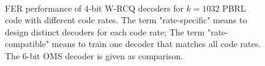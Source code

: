 \documentclass [PhD] {uclathes}
\begin{document}
\begin{figure}[hp] 
    \centering
  \\
  \caption{FER performance of 4-bit W-RCQ decoders for $k=1032$ PBRL code with different code rates. The term "rate-specific" means to design distinct decoders for each code rate; The term "rate-compatible" means to train one decoder that matches all code rates. The 6-bit OMS decoder is given as comparison. }\label{fig: pbrl}
\end{figure}
\end{document}
